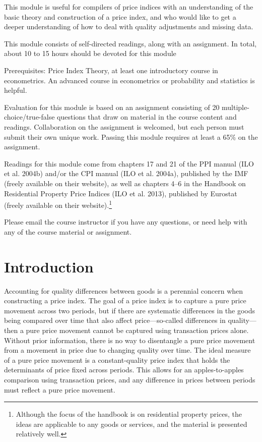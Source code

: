 \documentclass[]{article}
\begin{document}
This module is useful for compilers of price indices with an understanding of the basic theory and construction of a price index, and who would like to get a deeper understanding of how to deal with quality adjustments and missing data.

This module consists of self-directed readings, along with an assignment. In total, about 10 to 15 hours should be devoted for this module

Prerequisites: Price Index Theory, at least one introductory course in econometrics. An advanced course in econometrics or probability and statistics is helpful.

Evaluation for this module is based on an assignment consisting of 20 multiple-choice/true-false questions that draw on material in the course content and readings. Collaboration on the assignment is welcomed, but each person must submit their own unique work. Passing this module requires at least a 65\% on the assignment.

Readings for this module come from chapters 17 and 21 of the PPI manual (ILO et al. 2004b) and/or the CPI manual (ILO et al. 2004a), published by the IMF (freely available on their website), as well as chapters 4--6 in the Handbook on Residential Property Price Indices (ILO et al. 2013), published by Eurostat (freely available on their website).\footnote{Although the focus of the handbook is on residential property prices, the ideas are applicable to any goods or services, and the material is presented relatively well.}

Please email the course instructor if you have any questions, or need help with any of the course material or assignment.

\hypertarget{introduction-1}{%
\section{Introduction}\label{introduction-1}}

Accounting for quality differences between goods is a perennial concern when constructing a price index. The goal of a price index is to capture a pure price movement across two periods, but if there are systematic differences in the goods being compared over time that also affect price---so-called differences in quality---then a pure price movement cannot be captured using transaction prices alone. Without prior information, there is no way to disentangle a pure price movement from a movement in price due to changing quality over time. The ideal measure of a pure price movement is a constant-quality price index that holds the determinants of price fixed across periods. This allows for an apples-to-apples comparison using transaction prices, and any difference in prices between periods must reflect a pure price movement.
\end{document}
